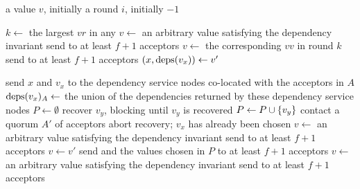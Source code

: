 \begin{algorithm*}[ht]
  \caption{%
    Majority Commit \BPaxos{} Proposer. Pseudocode for initiating recovery and
    handling  messages is ommitted because it is identical to
    the pseudocode in .
  }%
  \begin{algorithmic}[1]
    \GlobalState a value $v$, initially \nullbot{}
    \GlobalState a round $i$, initially $-1$

      \State $k \gets$ the largest $vr$ in any 
       
        \State $v \gets$ an arbitrary value satisfying the dependency invariant
        \State send  to at least $f + 1$ acceptors
       
        \State $v \gets$ the corresponding $vv$ in round $k$
        \State send  to at least $f + 1$ acceptors
       
        \State $(x, \text{deps}(v_x)) \gets v'$

        \State send $x$ and $v_x$ to the dependency service nodes co-located
               with the acceptors in $A$
        \State $\text{deps}(v_x)_A \gets$ the union of the dependencies returned by
               these dependency service nodes
        \State
        \State $P \gets \emptyset$
            \State recover $v_y$, blocking until $v_y$ is recovered
          \EndIf
            \State $P \gets P \cup \{v_y\}$
          \Else{}
            \State contact a quorum $A'$ of acceptors
              \State abort recovery; $v_x$ has already been chosen
            \Else{}
              \State $v \gets$ an arbitrary value satisfying the dependency invariant
              \State send  to at least $f + 1$ acceptors
            \EndIf{}
          \EndIf{}
        \EndFor{}
        \State $v \gets v'$
        \State send  and the values chosen in $P$ to at
               least $f + 1$ acceptors
      \Else{} 
        \State $v \gets$ an arbitrary value satisfying the dependency invariant
        \State send  to at least $f + 1$ acceptors
      \EndIf
    \EndUpon
  \end{algorithmic}
\end{algorithm*}
